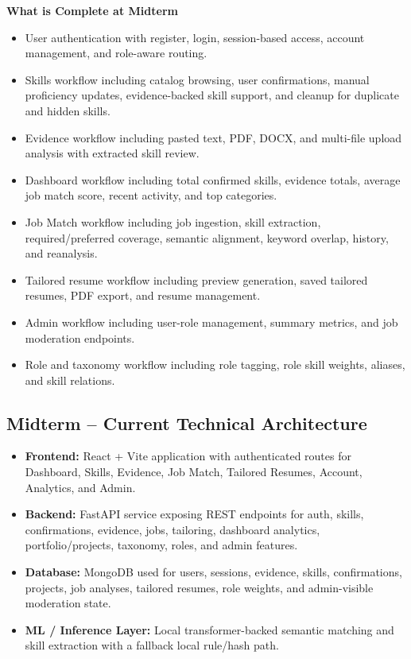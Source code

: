 \documentclass[11pt]{article}
\begin{document}
\vspace{0.75em}
\noindent\textbf{What is Complete at Midterm}
\begin{itemize}
  \item User authentication with register, login, session-based access, account management, and role-aware routing.
  \item Skills workflow including catalog browsing, user confirmations, manual proficiency updates, evidence-backed skill support, and cleanup for duplicate and hidden skills.
  \item Evidence workflow including pasted text, PDF, DOCX, and multi-file upload analysis with extracted skill review.
  \item Dashboard workflow including total confirmed skills, evidence totals, average job match score, recent activity, and top categories.
  \item Job Match workflow including job ingestion, skill extraction, required/preferred coverage, semantic alignment, keyword overlap, history, and reanalysis.
  \item Tailored resume workflow including preview generation, saved tailored resumes, PDF export, and resume management.
  \item Admin workflow including user-role management, summary metrics, and job moderation endpoints.
  \item Role and taxonomy workflow including role tagging, role skill weights, aliases, and skill relations.
\end{itemize}

\subsection*{Midterm -- Current Technical Architecture}
\begin{itemize}
  \item \textbf{Frontend:} React + Vite application with authenticated routes for Dashboard, Skills, Evidence, Job Match, Tailored Resumes, Account, Analytics, and Admin.
  \item \textbf{Backend:} FastAPI service exposing REST endpoints for auth, skills, confirmations, evidence, jobs, tailoring, dashboard analytics, portfolio/projects, taxonomy, roles, and admin features.
  \item \textbf{Database:} MongoDB used for users, sessions, evidence, skills, confirmations, projects, job analyses, tailored resumes, role weights, and admin-visible moderation state.
  \item \textbf{ML / Inference Layer:} Local transformer-backed semantic matching and skill extraction with a fallback local rule/hash path.
\end{itemize}
\end{document}
